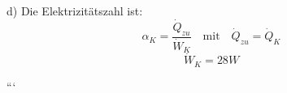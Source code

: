 d) Die Elektrizitätszahl ist:
\[
\alpha_K = \frac{\dot{Q}_{zu}}{\dot{W}_K} \quad \text{mit} \quad \dot{Q}_{zu} = \dot{Q}_K
\]
\[
\dot{W}_K = 28 W
\]

```